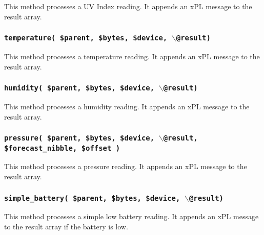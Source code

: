 \documentclass[12pt,a4paper]{article}
\begin{document}
This method processes a UV Index reading.  It appends an xPL message
to the result array.

\subsubsection*{\texttt{temperature( \$parent, \$bytes, \$device, $\backslash$@result)}\label{xPL::RF::Oregon_temperature_parent_bytes_device_backslash_result_}}


This method processes a temperature reading.  It appends an xPL message
to the result array.

\subsubsection*{\texttt{humidity( \$parent, \$bytes, \$device, $\backslash$@result)}\label{xPL::RF::Oregon_humidity_parent_bytes_device_backslash_result_}}


This method processes a humidity reading.  It appends an xPL message
to the result array.

\subsubsection*{\texttt{pressure( \$parent, \$bytes, \$device, $\backslash$@result, \$forecast\_nibble,
                   \$offset )}\label{xPL::RF::Oregon__texttt_pressure_parent_bytes_device_backslash_result_forecast_nibble_offset_}}


This method processes a pressure reading.  It appends an xPL message
to the result array.

\subsubsection*{\texttt{simple\_battery( \$parent, \$bytes, \$device, $\backslash$@result)}\label{xPL::RF::Oregon_simple_battery_parent_bytes_device_backslash_result_}}


This method processes a simple low battery reading.  It appends an xPL
message to the result array if the battery is low.
\end{document}
